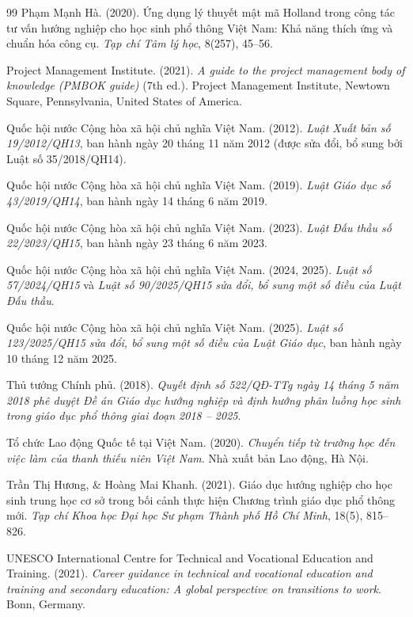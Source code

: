 \begin{thebibliography}{99}
Phạm Mạnh Hà. (2020). Ứng dụng lý thuyết mật mã Holland trong công tác tư vấn hướng nghiệp cho học sinh phổ thông Việt Nam: Khả năng thích ứng và chuẩn hóa công cụ. \textit{Tạp chí Tâm lý học}, 8(257), 45--56.

Project Management Institute. (2021). \textit{A guide to the project management body of knowledge (PMBOK guide)} (7th ed.). Project Management Institute, Newtown Square, Pennsylvania, United States of America.

Quốc hội nước Cộng hòa xã hội chủ nghĩa Việt Nam. (2012). \textit{Luật Xuất bản số 19/2012/QH13}, ban hành ngày 20 tháng 11 năm 2012 (được sửa đổi, bổ sung bởi Luật số 35/2018/QH14).

Quốc hội nước Cộng hòa xã hội chủ nghĩa Việt Nam. (2019). \textit{Luật Giáo dục số 43/2019/QH14}, ban hành ngày 14 tháng 6 năm 2019.

Quốc hội nước Cộng hòa xã hội chủ nghĩa Việt Nam. (2023). \textit{Luật Đấu thầu số 22/2023/QH15}, ban hành ngày 23 tháng 6 năm 2023.

Quốc hội nước Cộng hòa xã hội chủ nghĩa Việt Nam. (2024, 2025). \textit{Luật số 57/2024/QH15} và \textit{Luật số 90/2025/QH15 sửa đổi, bổ sung một số điều của Luật Đấu thầu}.

Quốc hội nước Cộng hòa xã hội chủ nghĩa Việt Nam. (2025). \textit{Luật số 123/2025/QH15 sửa đổi, bổ sung một số điều của Luật Giáo dục}, ban hành ngày 10 tháng 12 năm 2025.

Thủ tướng Chính phủ. (2018). \textit{Quyết định số 522/QĐ-TTg ngày 14 tháng 5 năm 2018 phê duyệt Đề án Giáo dục hướng nghiệp và định hướng phân luồng học sinh trong giáo dục phổ thông giai đoạn 2018 -- 2025}.

Tổ chức Lao động Quốc tế tại Việt Nam. (2020). \textit{Chuyển tiếp từ trường học đến việc làm của thanh thiếu niên Việt Nam}. Nhà xuất bản Lao động, Hà Nội.

Trần Thị Hương, \& Hoàng Mai Khanh. (2021). Giáo dục hướng nghiệp cho học sinh trung học cơ sở trong bối cảnh thực hiện Chương trình giáo dục phổ thông mới. \textit{Tạp chí Khoa học Đại học Sư phạm Thành phố Hồ Chí Minh}, 18(5), 815--826.

UNESCO International Centre for Technical and Vocational Education and Training. (2021). \textit{Career guidance in technical and vocational education and training and secondary education: A global perspective on transitions to work}. Bonn, Germany.

\end{thebibliography}

